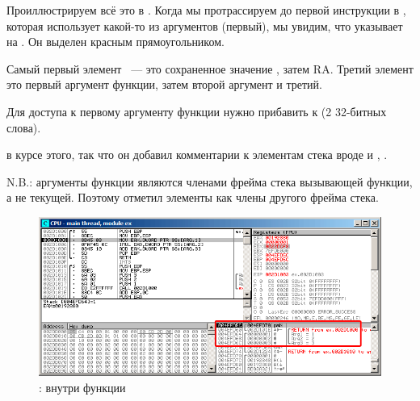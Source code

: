 \myindex{\olly}
Проиллюстрируем всё это в \olly.
Когда мы протрассируем до первой инструкции в \ttf, которая использует какой-то из аргументов
(первый), мы увидим, что \EBP указывает на . Он выделен красным прямоугольником.

Самый первый элемент ~--- это сохраненное значение \EBP, 
затем \ac{RA}. Третий элемент это первый аргумент функции, затем второй аргумент и третий.

Для доступа к первому аргументу функции нужно прибавить к  (2 32-битных слова).

\olly в курсе этого, так что он добавил комментарии к элементам стека вроде
 и , \etc{}.

N.B.: аргументы функции являются членами фрейма стека вызывающей функции, а не текущей.
Поэтому \olly отметил элементы  как члены другого фрейма стека.

\begin{figure}[H]
\centering
\includegraphics[scale=\FigScale]{patterns/05_passing_arguments/olly.png}
\caption{\olly: внутри функции \ttf{}}
\label{fig:passing_arguments_olly}
\end{figure}
